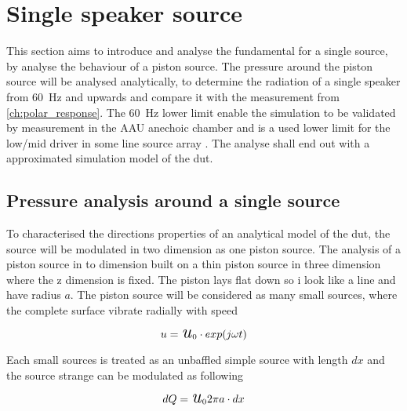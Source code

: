 \section{Single speaker source}
This section aims to introduce and analyse the fundamental for a single source, by analyse the behaviour of a piston source. The pressure around the piston source will be analysed analytically, to determine the radiation of a single speaker from \SI{60}{\hertz} and upwards and compare it with the measurement from \autoref{ch:polar_response}. The \SI{60}{\hertz} lower limit enable the simulation to be validated by measurement in the AAU anechoic chamber and is a used lower limit for the low/mid driver in some line source array \citep{V-DOSC}.  The analyse shall end out with a approximated simulation model of the \gls{dut}.

\subsection{Pressure analysis around a single source}
To characterised the directions properties of an analytical model of the \gls{dut}, the source will be modulated in two dimension as one piston source. The analysis of a piston source in to dimension built on a thin piston source in three dimension where the z dimension is fixed. The piston lays flat down so i look like a line and have radius $a$. The piston source will be considered as many small sources, where the complete surface vibrate radially with speed

\begin{equation}
u = \text{\textit{{\LARGE u}}}_{0} \cdot exp(j \omega t)
\end{equation}

    \startexplain
    \stopexplain
    
Each small sources is treated as an unbaffled simple source with length $dx$ and the source strange can be modulated as following      

\begin{equation}
dQ = \text{\textit{{\LARGE u}}}_{0} 2 \pi a \cdot dx
\end{equation}

    \startexplain
    \stopexplain    
 
